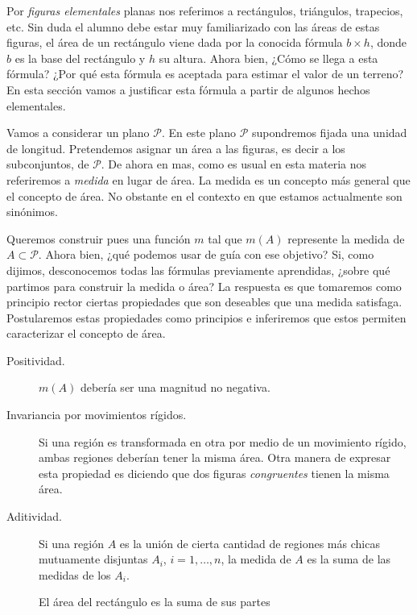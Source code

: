  


Por \emph{figuras elementales} planas nos referimos a rectángulos, triángulos, trapecios, etc. Sin duda el alumno  debe estar  muy familiarizado con las áreas de estas figuras, el área de un rectángulo viene dada por la conocida fórmula $b\times h$, donde $b$ es la base del rectángulo y $h$ su altura.  Ahora bien, ¿Cómo 
se llega a esta fórmula? ¿Por qué esta fórmula es aceptada para estimar el valor de un terreno? En esta sección vamos a justificar esta fórmula a partir de algunos hechos elementales.



Vamos a considerar un plano $\mathcal{P}$. En este plano $\mathcal{P}$ supondremos fijada una unidad de longitud.  Pretendemos asignar un área a las figuras, es decir a los subconjuntos, de $\mathcal{P}$. De ahora en mas, como es usual en esta materia  nos referiremos a \emph{medida} en lugar de área. La medida es un concepto más general  que el concepto de área. No obstante en el contexto en que estamos actualmente son sinónimos.  

Queremos construir pues una función $m$ tal que $m(A)$ represente la medida  de  $A\subset\mathcal{P}$. Ahora bien, ¿qué podemos usar de guía con ese objetivo? Si, como dijimos,  desconocemos todas las fórmulas previamente aprendidas, ¿sobre qué partimos para construir la medida o área? La respuesta es que tomaremos como principio rector  ciertas propiedades que son deseables  que una medida satisfaga. Postularemos estas propiedades como principios e inferiremos que estos permiten caracterizar el concepto de área.  




\begin{description}
 \item[Positividad.] $m(A)$ debería ser una magnitud no negativa.  
 \item[Invariancia por movimientos rígidos.] Si una región es transformada en otra por medio de un movimiento rígido, ambas regiones deberían tener la misma área. Otra manera de expresar esta propiedad es diciendo que dos figuras \emph{congruentes} tienen la misma área. 
 \item[Aditividad.] Si una región $A$ es la unión de cierta cantidad de regiones más chicas mutuamente disjuntas $A_i$, $i=1,\ldots,n$, la medida   de $A$ es la suma de las medidas de los $A_i$.
\end{description}

\begin{figure}[h]
\begin{center}
 
 \caption{El área del rectángulo es la suma de sus partes}\label{fig:rect_descop} 
\end{center}
\end{figure}

